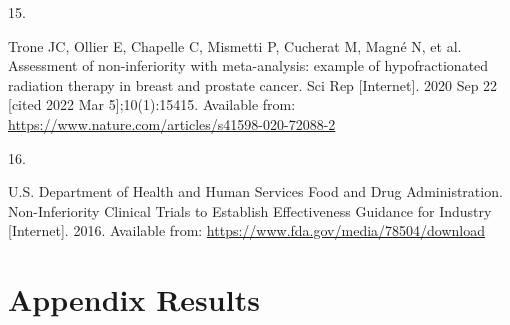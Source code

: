 \documentclass[
  12pt,
]{article}
\newlength{\cslhangindent}
\newlength{\csllabelwidth}
\newlength{\cslentryspacingunit} %
\newenvironment{CSLReferences}[2] %
 {%
  \setlength{\parindent}{0pt}
  \ifodd #1
  \let\oldpar\par
  \def\par{\hangindent=\cslhangindent\oldpar}
  \fi
  \setlength{\parskip}{#2\cslentryspacingunit}
 }%
 {}
\newcommand{\CSLLeftMargin}[1]{\parbox[t]{\csllabelwidth}{#1}}
\newcommand{\CSLRightInline}[1]{\parbox[t]{\linewidth - \csllabelwidth}{#1}\break}
\begin{document}
\begin{CSLReferences}{0}{0}
\leavevmode{}%
\CSLLeftMargin{15. }
\CSLRightInline{Trone JC, Ollier E, Chapelle C, Mismetti P, Cucherat M,
Magné N, et al. Assessment of non-inferiority with meta-analysis:
example of hypofractionated radiation therapy in breast and prostate
cancer. Sci Rep {[}Internet{]}. 2020 Sep 22 {[}cited 2022 Mar
5{]};10(1):15415. Available from:
\url{https://www.nature.com/articles/s41598-020-72088-2}}

\leavevmode{}%
\CSLLeftMargin{16. }
\CSLRightInline{U.S. Department of Health and Human Services Food and
Drug Administration. Non-Inferiority Clinical Trials to Establish
Effectiveness Guidance for Industry {[}Internet{]}. 2016. Available
from: \url{https://www.fda.gov/media/78504/download}}

\end{CSLReferences}

\newpage

\hypertarget{appendix-results}{%
\section{Appendix Results}\label{appendix-results}}

\end{document}
